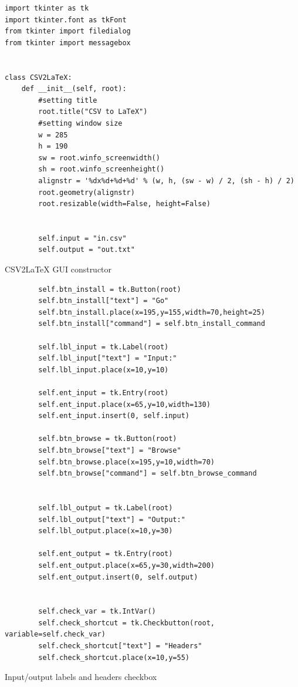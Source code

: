\documentclass[11pt]{article}
\begin{document}
        \newpage
        \begin{listing}[!h]
            \begin{verbatim}
import tkinter as tk
import tkinter.font as tkFont
from tkinter import filedialog
from tkinter import messagebox


class CSV2LaTeX:
    def __init__(self, root):
        #setting title
        root.title("CSV to LaTeX")
        #setting window size
        w = 285
        h = 190
        sw = root.winfo_screenwidth()
        sh = root.winfo_screenheight()
        alignstr = '%dx%d+%d+%d' % (w, h, (sw - w) / 2, (sh - h) / 2)
        root.geometry(alignstr)
        root.resizable(width=False, height=False)
        
        
        self.input = "in.csv"
        self.output = "out.txt"
            \end{verbatim}
            \caption{CSV2LaTeX GUI constructor}
            \label{sc:csv2latex-gui-init-1}
        \end{listing}

        \newpage
        \begin{listing}[!h]
            \begin{verbatim}
        self.btn_install = tk.Button(root)
        self.btn_install["text"] = "Go"
        self.btn_install.place(x=195,y=155,width=70,height=25)
        self.btn_install["command"] = self.btn_install_command
        
        self.lbl_input = tk.Label(root)
        self.lbl_input["text"] = "Input:"
        self.lbl_input.place(x=10,y=10)
        
        self.ent_input = tk.Entry(root)
        self.ent_input.place(x=65,y=10,width=130)
        self.ent_input.insert(0, self.input)
        
        self.btn_browse = tk.Button(root)
        self.btn_browse["text"] = "Browse"
        self.btn_browse.place(x=195,y=10,width=70)
        self.btn_browse["command"] = self.btn_browse_command
        
        
        self.lbl_output = tk.Label(root)
        self.lbl_output["text"] = "Output:"
        self.lbl_output.place(x=10,y=30)
        
        self.ent_output = tk.Entry(root)
        self.ent_output.place(x=65,y=30,width=200)
        self.ent_output.insert(0, self.output)
        
        
        self.check_var = tk.IntVar()
        self.check_shortcut = tk.Checkbutton(root, variable=self.check_var)
        self.check_shortcut["text"] = "Headers"
        self.check_shortcut.place(x=10,y=55)
            \end{verbatim}
            \caption{Input/output labels and headers checkbox}
            \label{sc:csv2latex-gui-init-2}
        \end{listing}
\end{document}
